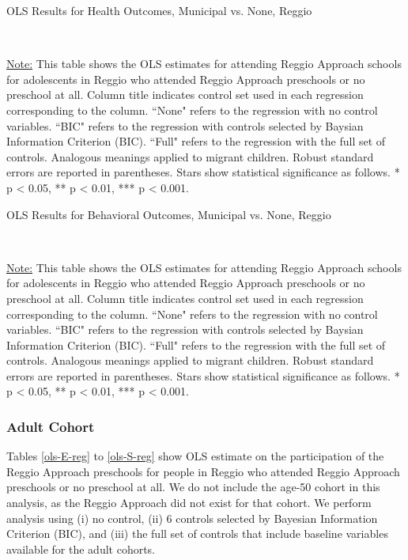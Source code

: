 \begin{table}[H] \caption{OLS Results for Health Outcomes, Municipal vs. None, Reggio} \label{ols-H-adol-reg}

\vspace{1ex} \\
\footnotesize\raggedright{\underline{Note:} This table shows the OLS estimates for attending Reggio Approach schools for adolescents in Reggio who attended Reggio Approach preschools or no preschool at all. Column title indicates control set used in each regression corresponding to the column. ``None" refers to the regression with no control variables. ``BIC" refers to the regression with controls selected by Baysian Information Criterion (BIC). ``Full" refers to the regression with the full set of controls. Analogous meanings applied to migrant children. Robust standard errors are reported in parentheses. Stars show statistical significance as follows. * p < 0.05, ** p < 0.01, *** p < 0.001.}
\end{table}

\begin{table}[H] \caption{OLS Results for Behavioral Outcomes, Municipal vs. None, Reggio} \label{ols-B-adol-reg}

\vspace{1ex} \\
\footnotesize\raggedright{\underline{Note:} This table shows the OLS estimates for attending Reggio Approach schools for adolescents in Reggio who attended Reggio Approach preschools or no preschool at all. Column title indicates control set used in each regression corresponding to the column. ``None" refers to the regression with no control variables. ``BIC" refers to the regression with controls selected by Baysian Information Criterion (BIC). ``Full" refers to the regression with the full set of controls. Analogous meanings applied to migrant children. Robust standard errors are reported in parentheses. Stars show statistical significance as follows. * p < 0.05, ** p < 0.01, *** p < 0.001.}
\end{table}

\subsubsection{Adult Cohort}
Tables \ref{ols-E-reg} to \ref{ols-S-reg} show OLS estimate on the participation of the Reggio Approach preschools for people in Reggio who attended Reggio Approach preschools or no preschool at all. We do not include the age-50 cohort in this analysis, as the Reggio Approach did not exist for that cohort. We perform analysis using (i) no control, (ii) 6 controls selected by Bayesian Information Criterion (BIC), and (iii) the full set of controls that include baseline variables available for the adult cohorts. 


